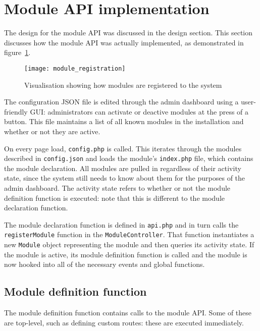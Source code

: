 \section{Module API implementation}

The design for the module API was discussed in the design section. This section discusses how the module API was actually implemented, as demonstrated in figure~\ref{uml:moduleRegistration}.

\begin{figure}[h!]
  \centering
    \ifimages
    \texttt{[image: module\_registration]}
    \fi
  \caption{Visualisation showing how modules are registered to the system}
  \label{uml:moduleRegistration}
\end{figure}

The configuration JSON file is edited through the admin dashboard using a user-friendly GUI: administrators can activate or deactive modules at the press of a button. This file maintains a list of all known modules in the installation and whether or not they are active.

On every page load, \lstinline{config.php} is called. This iterates through the modules described in \lstinline{config.json} and loads the module's \lstinline{index.php} file, which contains the module declaration. All modules are pulled in regardless of their activity state, since the system still needs to know about them for the purposes of the admin dashboard. The activity state refers to whether or not the module definition function is executed: note that this is different to the module declaration function.

The module declaration function is defined in \lstinline{api.php} and in turn calls the \lstinline{registerModule} function in the \lstinline{ModuleController}. That function instantiates a new \lstinline{Module} object representing the module and then queries its activity state. If the module is active, its module definition function is called and the module is now hooked into all of the necessary events and global functions.

\subsection{Module definition function}

The module definition function contains calls to the module API. Some of these are top-level, such as defining custom routes: these are executed immediately.


